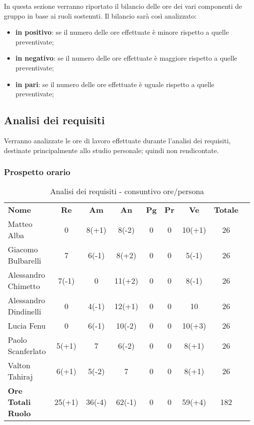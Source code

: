 
In questa sezione verranno riportato il bilancio delle ore dei vari componenti de gruppo in base ai ruoli sostenuti. Il bilancio sarà così analizzato:
\begin{itemize}
	\item {\bfseries in positivo}: se il numero delle ore effettuate è minore rispetto a quelle preventivate;
	\item {\bfseries in negativo}: se il numero delle ore effettuate è maggiore rispetto a quelle preventivate;
	\item {\bfseries in pari}: se il numero delle ore effettuate è uguale rispetto a quelle preventivate; \\
\end{itemize}

\subsection {Analisi dei requisiti}
Verranno analizzate le ore di lavoro effettuate durante l'analisi dei requisiti, destinate principalmente allo studio personale; quindi non rendicontate.
\subsubsection{Prospetto orario}
	\begin{table} [h!]
	\begin{center}
		\begin{tabular} { m{6 cm} c c c c c c c c }
			\rowcolor{lightgray}
			\textbf{Nome} & \textbf{Re} & \textbf{Am} & \textbf{An} & \textbf{Pg} &\textbf{Pr} & \textbf{Ve} & \textbf{Totale} \\ 
			Matteo Alba & 0 & 8(+1) &8(-2) & 0 & 0 & 10(+1) & 26  \\ 
			Giacomo Bulbarelli & 7 & 6(-1) & 8(+2) & 0 & 0 & 5(-1) & 26 \\ 
			Alessandro Chimetto & 7(-1) & 0 & 11(+2) & 0 & 0 & 8(-1) & 26 \\
			Alessandro Dindinelli & 0 & 4(-1) & 12(+1) & 0 & 0 & 10 & 26 \\
			Lucia Fenu & 0 & 6(-1) & 10(-2) & 0 & 0 & 10(+3) & 26 \\
			Paolo Scanferlato & 5(+1) & 7 & 6(-2) & 0 & 0 & 8(+1) & 26 \\
			Valton Tahiraj & 6(+1) & 5(-2) &7 & 0 & 0 & 8(+1) & 26 \\
			\textbf{Ore Totali Ruolo} & 25(+1) & 36(-4) & 62(-1) & 0 & 0 & 59(+4) & 182\\
		
		\end{tabular}
		\caption{Analisi dei requisiti - consuntivo ore/persona}
	\end{center}
\end{table}
\newpage
